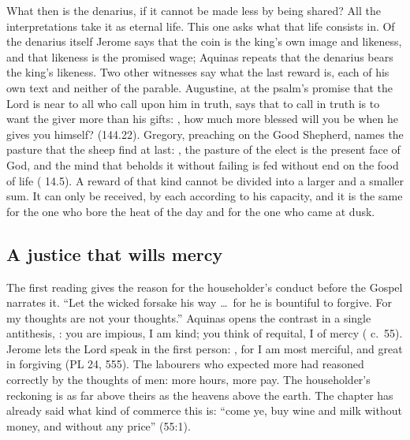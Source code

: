 What then is the denarius, if it cannot be made less by being shared? All the
interpretations take it as eternal life. This one asks what that life
consists in. Of the denarius itself Jerome says that the coin is the king's
own image and likeness, and that likeness is the promised wage; Aquinas
repeats that the denarius bears the king's likeness. Two other witnesses say
what the last reward is, each of his own text and neither of the parable.
Augustine, at the psalm's promise that the Lord is near to all who call upon him in truth, says
that to call in truth is to want the giver more than his gifts: , how much more blessed will you be
when he gives you himself? (144.22). Gregory, preaching on the Good Shepherd,
names the pasture that the sheep find at last: , the pasture of the elect is the present face of
God, and the mind that beholds it without failing is fed without end on the
food of life ( 14.5). A reward of that kind cannot
be divided into a larger and a smaller sum. It can only be received, by each
according to his capacity, and it is the same for the one who bore the heat of
the day and for the one who came at dusk.

\subsection{A justice that wills mercy}

The first reading gives the reason for the householder's conduct before the
Gospel narrates it. ``Let the wicked forsake his way \ldots\ for he is
bountiful to forgive. For my thoughts are not your thoughts.'' Aquinas opens
the contrast in a single antithesis, : you are impious, I am kind; you think of
requital, I of mercy ( c.~55). Jerome lets the Lord speak in
the first person: , for I am most merciful, and great in forgiving (PL 24, 555). The
labourers who expected more had reasoned correctly by the thoughts of men: more
hours, more pay. The householder's reckoning is as far above theirs as the
heavens above the earth. The chapter has already said what kind of commerce
this is: ``come ye, buy wine and milk without money, and without any price''
(55:1).

